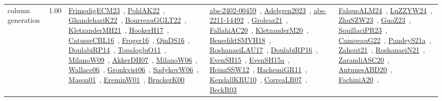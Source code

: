 {\begin{longtable}{p{3cm}r>{\raggedright\arraybackslash}p{6cm}>{\raggedright\arraybackslash}p{6cm}>{\raggedright\arraybackslash}p{8cm}}
\index{column generation}\index{Algorithms!column generation}column generation &  1.00 & \href{../works/FrimodigECM23.pdf}{FrimodigECM23}~\cite{FrimodigECM23}, \href{../works/PohlAK22.pdf}{PohlAK22}~\cite{PohlAK22}, \href{../works/GhandehariK22.pdf}{GhandehariK22}~\cite{GhandehariK22}, \href{../works/BourreauGGLT22.pdf}{BourreauGGLT22}~\cite{BourreauGGLT22}, \href{../works/KletzanderMH21.pdf}{KletzanderMH21}~\cite{KletzanderMH21}, \href{../works/HookerH17.pdf}{HookerH17}~\cite{HookerH17}, \href{../works/CatusseCBL16.pdf}{CatusseCBL16}~\cite{CatusseCBL16}, \href{../works/Froger16.pdf}{Froger16}~\cite{Froger16}, \href{../works/QinDS16.pdf}{QinDS16}~\cite{QinDS16}, \href{../works/DoulabiRP14.pdf}{DoulabiRP14}~\cite{DoulabiRP14}, \href{../works/TopalogluO11.pdf}{TopalogluO11}~\cite{TopalogluO11}, \href{../works/MilanoW09.pdf}{MilanoW09}~\cite{MilanoW09}, \href{../works/AkkerDH07.pdf}{AkkerDH07}~\cite{AkkerDH07}, \href{../works/MilanoW06.pdf}{MilanoW06}~\cite{MilanoW06}, \href{../works/Wallace06.pdf}{Wallace06}~\cite{Wallace06}, \href{../works/Gronkvist06.pdf}{Gronkvist06}~\cite{Gronkvist06}, \href{../works/SadykovW06.pdf}{SadykovW06}~\cite{SadykovW06}, \href{../works/Mason01.pdf}{Mason01}~\cite{Mason01}, \href{../works/EreminW01.pdf}{EreminW01}~\cite{EreminW01}, \href{../works/BruckerK00.pdf}{BruckerK00}~\cite{BruckerK00} & \href{../works/abs-2402-00459.pdf}{abs-2402-00459}~\cite{abs-2402-00459}, \href{../works/Adelgren2023.pdf}{Adelgren2023}~\cite{Adelgren2023}, \href{../works/abs-2211-14492.pdf}{abs-2211-14492}~\cite{abs-2211-14492}, \href{../works/Groleaz21.pdf}{Groleaz21}~\cite{Groleaz21}, \href{../works/FallahiAC20.pdf}{FallahiAC20}~\cite{FallahiAC20}, \href{../works/KletzanderM20.pdf}{KletzanderM20}~\cite{KletzanderM20}, \href{../works/BenediktSMVH18.pdf}{BenediktSMVH18}~\cite{BenediktSMVH18}, \href{../works/RoshanaeiLAU17.pdf}{RoshanaeiLAU17}~\cite{RoshanaeiLAU17}, \href{../works/DoulabiRP16.pdf}{DoulabiRP16}~\cite{DoulabiRP16}, \href{../works/EvenSH15.pdf}{EvenSH15}~\cite{EvenSH15}, \href{../works/EvenSH15a.pdf}{EvenSH15a}~\cite{EvenSH15a}, \href{../works/HeinzSSW12.pdf}{HeinzSSW12}~\cite{HeinzSSW12}, \href{../works/HachemiGR11.pdf}{HachemiGR11}~\cite{HachemiGR11}, \href{../works/KendallKRU10.pdf}{KendallKRU10}~\cite{KendallKRU10}, \href{../works/CorreaLR07.pdf}{CorreaLR07}~\cite{CorreaLR07}, \href{../works/BeckR03.pdf}{BeckR03}~\cite{BeckR03} & \href{../works/FalqueALM24.pdf}{FalqueALM24}~\cite{FalqueALM24}, \href{../works/LuZZYW24.pdf}{LuZZYW24}~\cite{LuZZYW24}, \href{../works/ZhuSZW23.pdf}{ZhuSZW23}~\cite{ZhuSZW23}, \href{../works/GuoZ23.pdf}{GuoZ23}~\cite{GuoZ23}, \href{../works/SquillaciPR23.pdf}{SquillaciPR23}~\cite{SquillaciPR23}, \href{../works/CampeauG22.pdf}{CampeauG22}~\cite{CampeauG22}, \href{../works/PandeyS21a.pdf}{PandeyS21a}~\cite{PandeyS21a}, \href{../works/Zahout21.pdf}{Zahout21}~\cite{Zahout21}, \href{../works/RoshanaeiN21.pdf}{RoshanaeiN21}~\cite{RoshanaeiN21}, \href{../works/ZarandiASC20.pdf}{ZarandiASC20}~\cite{ZarandiASC20}, \href{../works/AntunesABD20.pdf}{AntunesABD20}~\cite{AntunesABD20}, \href{../works/FachiniA20.pdf}{FachiniA20}~\cite{FachiniA20}, 
\end{longtable}}
